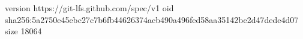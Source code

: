 version https://git-lfs.github.com/spec/v1
oid sha256:5a2750e45ebc27c7b6fb44626374acb490a496fed58aa35142be2d47dede4d07
size 18064
